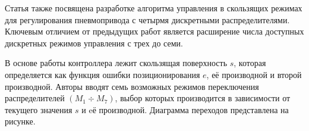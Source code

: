 Статья \cite*{Hodgson:article1} также посвящена разработке алгоритма управления в скользящих режимах
для регулирования пневмопривода
с четырмя дискретными распределителями.
Ключевым отличием от предыдущих работ является расширение числа доступных дискретных режимов управления
с трех до семи.

В основе работы контроллера лежит скользящая поверхность $s$, которая определяется как функция ошибки позиционирования $e$,
её производной и второй производной. Авторы вводят семь возможных режимов переключения распределителей $(M_1 \div M_7)$,
выбор которых производится в зависимости от текущего значения $s$ и eё производной. Диаграмма переходов
представлена на рисунке.

\begin{figure}[ht]
\end{figure}
